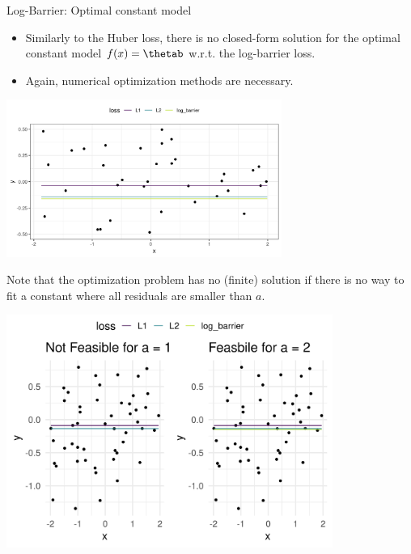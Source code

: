 \begin{vbframe}{Log-Barrier: Optimal constant model}

\begin{itemize}
 \item Similarly to the Huber loss, there is no closed-form solution for the optimal constant model $\fx = \thetab$ w.r.t. the log-barrier loss. 
 \item Again, numerical optimization methods are necessary. 
\end{itemize}

\vspace{0.2cm}

\begin{center}
\includegraphics[width = 9cm ]{figure_man/log_barrier2.png} \\
\end{center}


\framebreak 


Note that the optimization problem has no (finite) solution if there is no way to fit a constant where all residuals are smaller than $a$. 

\vspace{- 0.2cm}


\begin{center}
\includegraphics[width = 0.8\textwidth]{figure_man/log_barrier_2_1.png} \\
\end{center}


\end{vbframe}

